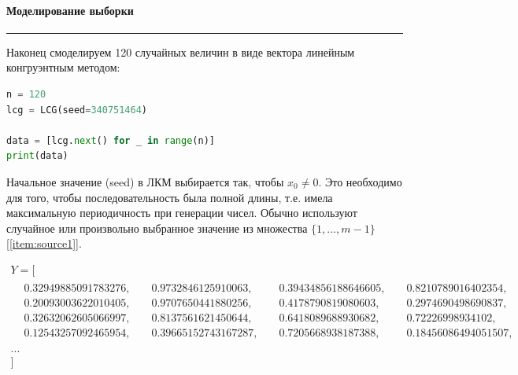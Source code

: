 \documentclass[a4paper, 14pt]{extarticle}
\begin{document}
\paragraph{Моделирование выборки}\vspace{-20pt}\rule{\linewidth}{0.1mm}

Наконец смоделируем 120 случайных величин в виде вектора линейным конгруэнтным методом:\\
\begin{center}
  \begin{lstlisting}[language=Python]
n = 120
lcg = LCG(seed=340751464)

data = [lcg.next() for _ in range(n)]
print(data)
  \end{lstlisting}
\end{center}
\vspace{10pt}
Начальное значение (seed) в ЛКМ выбирается так, чтобы $x_0 \neq 0$. Это необходимо для того, чтобы 
последовательность была полной длины, т.е. имела максимальную периодичность 
при генерации чисел. Обычно используют случайное или произвольно выбранное 
значение из множества $\{1, ..., m - 1\}$ [\ref{item:source1}]. 

\noindent
\begin{adjustbox}{max width=1\textwidth}
  \parbox{\linewidth}{%
    \begin{gather*}
      Y = [ \\
      \begin{aligned}
        & 0.32949885091783276, & \hspace{3pt} & 0.9732846125910063,  & \hspace{3pt} & 0.39434856188646605, & \hspace{3pt} & 0.8210789016402354,  & \\
        & 0.20093003622010405, & \hspace{3pt} & 0.9707650441880256,  & \hspace{3pt} & 0.4178790819080603,  & \hspace{3pt} & 0.2974690498690837,  & \\
        & 0.32632062605066997, & \hspace{3pt} & 0.8137561621450644,  & \hspace{3pt} & 0.6418089688930682,  & \hspace{3pt} & 0.72226998934102,    & \\
        & 0.12543257092465954, & \hspace{3pt} & 0.39665152743167287, & \hspace{3pt} & 0.7205668938187388,  & \hspace{3pt} & 0.18456086494051507, & \\ 
      \end{aligned} \\
      ...\\
      ]
    \end{gather*}
  }
\end{adjustbox}
\end{document}
